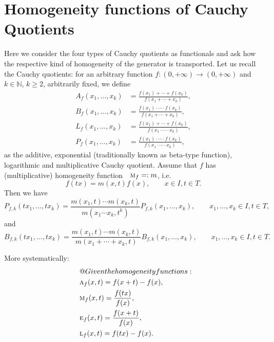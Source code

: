 \documentclass{amsart}
\makeatletter
\theoremstyle{plain}
\numberwithin{equation}{section}
\def\RIfM@{\relax\ifmmode}%
\def\RIfM@{\relax\protect\ifmmode}
\def\text{\RIfM@\expandafter\text@\else\expandafter\mbox\fi}
\def\text@#1{\mathchoice
   {\textdef@\displaystyle\f@size{#1}}%
   {\textdef@\textstyle\tf@size{\firstchoice@false #1}}%
   {\textdef@\textstyle\sf@size{\firstchoice@false #1}}%
   {\textdef@\textstyle \ssf@size{\firstchoice@false #1}}%
   \glb@settings}
\def\textdef@#1#2#3{\hbox{{%
                    \everymath{#1}%
                    \let\f@size#2\selectfont
                    #3}}}
\newif\iffirstchoice@
\newcommand{\mh}{\textsc{m}}
\newcommand{\eh}{\textsc{e}}
\newcommand{\N}{{\mathbb{N}}}
\makeatother
\begin{document}
\section{Homogeneity functions of Cauchy Quotients}
Here we consider the four types of Cauchy quotients as functionals 
and ask how the respective kind of homogeneity of the generator is transported.
Let us recall the Cauchy quotients: for an arbitrary function $f: (0, + \infty) \to (0, + \infty)$
and $k \in \N$, $k \geq 2$, arbitrarily fixed,
we define
\begin{align*}
A_f (x_1, \ldots, x_k)&=\frac{f(x_1)+ \cdots + f(x_k)}{f(x_1 + \cdots + x_k)}, \\
B_f (x_1, \ldots, x_k)&=\frac{f(x_1)\cdot \cdots \cdot f(x_k)}{f(x_1 + \cdots + x_k)}, \\
L_f (x_1, \ldots, x_k)&=\frac{f(x_1)+ \cdots + f(x_k)}{f(x_1 \cdot \cdots \cdot x_k)}, \\
P_f (x_1, \ldots, x_k)&=\frac{f(x_1) \cdot \cdots \cdot f(x_k)}{f(x_1 \cdot \cdots \cdot x_k)}, 
\end{align*}
as the additive, exponential (traditionally known as beta-type function), logarithmic and multiplicative Cauchy quotient.
%
Assume that $f$ has (multiplicative) homogeneity function $\mh_f=:m$, i.e. 
\begin{equation*}
f(tx)= m(x,t) f(x), \qquad x \in I,t \in T.
\end{equation*}
%
Then we have
\begin{equation*}
P_{f,k}(tx_1, \ldots, tx_k)= \frac{m(x_1, t) \cdots m(x_k, t)}{m(x_1 \cdots x_k, t^k)} P_{f,k} (x_1, \ldots, x_k), \qquad x_1, \ldots, x_k \in I, t \in T,
\end{equation*}
and
\begin{equation*}
B_{f,k}(tx_1, \ldots, tx_k)= \frac{m(x_1, t) \cdots m(x_k, t)}{m(x_1 +\cdots +x_k, t)} B_{f,k} (x_1, \ldots, x_k), \qquad x_1, \ldots, x_k \in I, t \in T.
\end{equation*}

More systematically:
\begin{align*}
&\text{Given the homogeneity functions:} \\
&\textsc{a}_f(x,t) = f(x+t) - f(x), \\
&\textsc{m}_f(x,t) = \frac{f(tx)}{f(x)}, \\
&\eh_f(x,t) = \frac{f(x+t)}{f(x)}, \\
&\textsc{l}_f(x,t) = f(tx) - f(x).
\end{align*}
\end{document}
